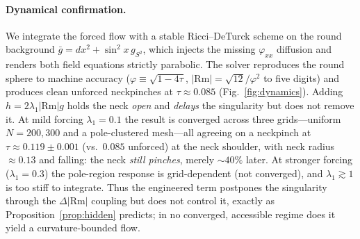 \documentclass[aps,prd,twocolumn,superscriptaddress,nofootinbib,floatfix]{revtex4-2}
\theoremstyle{plain}
\theoremstyle{definition}
\newcommand{\Rm}{\mathrm{Rm}}
\begin{document}
\paragraph{Dynamical confirmation.}
We integrate the forced flow with a stable Ricci--DeTurck scheme on the round background $\bar g=dx^2+\sin^2x\,g_{S^2}$, which injects the missing $\varphi_{xx}$ diffusion and renders both field equations strictly parabolic. The solver reproduces the round sphere to machine accuracy ($\varphi\equiv\sqrt{1-4\tau}$, $|\Rm|=\sqrt{12}/\varphi^2$ to five digits) and produces clean unforced neckpinches at $\tau\approx0.085$ (Fig.~\ref{fig:dynamics}). Adding $h=2\lambda_1|\Rm|g$ holds the neck \emph{open} and \emph{delays} the singularity but does not remove it. At mild forcing $\lambda_1=0.1$ the result is converged across three grids---uniform $N=200,300$ and a pole-clustered mesh---all agreeing on a neckpinch at $\tau\approx0.119\pm0.001$ (vs.\ $0.085$ unforced) at the neck shoulder, with neck radius $\approx0.13$ and falling: the neck \emph{still pinches}, merely $\sim40\%$ later. At stronger forcing ($\lambda_1=0.3$) the pole-region response is grid-dependent (not converged), and $\lambda_1\gtrsim1$ is too stiff to integrate. Thus the engineered term postpones the singularity through the $\Delta|\Rm|$ coupling but does not control it, exactly as Proposition~\ref{prop:hidden} predicts; in no converged, accessible regime does it yield a curvature-bounded flow.
\end{document}

